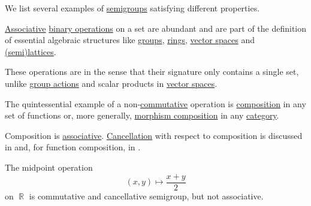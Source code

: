 \begin{example}\label{ex:def:binary_operation}
  We list several examples of \hyperref[def:semigroup]{semigroups} satisfying different properties.

  \begin{thmenum}
     \hyperref[eq:def:binary_operation/associative]{Associative} \hyperref[def:binary_operation]{binary operations} on a set are abundant and are part of the definition of essential algebraic structures like \hyperref[def:group]{groups}, \hyperref[def:ring]{rings}, \hyperref[def:vector_space]{vector spaces} and \hyperref[def:semilattice]{(semi)lattices}.

    These operations are  in the sense that their signature only contains a single set, unlike \hyperref[def:group_action]{group actions} and scalar products in \hyperref[def:vector_space]{vector spaces}.

     The quintessential example of a non-\hyperref[def:binary_operation/commutative]{commutative} operation is \hyperref[def:set_valued_map/composition]{composition} in any set of functions or, more generally, \hyperref[def:category/composition]{morphism composition} in any \hyperref[def:category]{category}.

    Composition is \hyperref[def:binary_operation/associative]{associative}. \hyperref[def:binary_operation/cancellative]{Cancellation} with respect to composition is discussed in  and, for function composition, in .

     The midpoint operation
    \begin{equation*}
      (x, y) \mapsto \dfrac {x + y} 2
    \end{equation*}
    on \( \BbbR \) is commutative and cancellative semigroup, but not associative.
  \end{thmenum}
\end{example}

